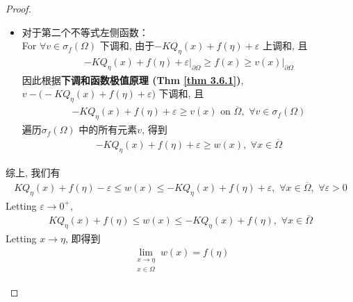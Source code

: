\begin{thm}
\begin{proof}
\begin{enumerate}
\begin{itemize}
					\item 对于第二个不等式左侧函数：\\
					For $\forall v \in \sigma_{f}(\Omega)$ 下调和, 由于$-K Q_{\eta}(x) + f(\eta) + \varepsilon$ 上调和, 且
					\begin{align*}
						-K Q_{\eta}(x) + f(\eta) + \varepsilon \Big|_{\partial \Omega} \geq f(x) \geq v(x) \Big|_{\partial \Omega}
					\end{align*}
					因此根据\textbf{下调和函数极值原理 (Thm \ref{thm 3.6.1})}, $v - \Big( -K Q_{\eta}(x) + f(\eta) + \varepsilon \Big)$ 下调和, 且
					\begin{align*}
						-K Q_{\eta}(x) + f(\eta) + \varepsilon \geq v(x) \,\, \text{on} \,\, \overline{\Omega} , \,\, \forall v \in \sigma_{f}(\Omega)
					\end{align*}
					遍历$\sigma_{f}(\Omega)$ 中的所有元素$v$, 得到
					\begin{align*}
						-K Q_{\eta}(x) + f(\eta) + \varepsilon \geq w(x) , \,\, \forall x \in \overline{\Omega}
					\end{align*}
				\end{itemize}
				
				\newpage
				
				综上, 我们有
				\begin{align*}
					K Q_\eta(x) + f(\eta) - \varepsilon \leq w(x) \leq -K Q_{\eta}(x) + f(\eta) + \varepsilon , \,\, \forall x \in \overline{\Omega} , \,\, \forall \varepsilon > 0
				\end{align*}
				Letting $\varepsilon \to 0^+$, 
				\begin{align*}
					K Q_\eta(x) + f(\eta) \leq w(x) \leq -K Q_{\eta}(x) + f(\eta) , \,\, \forall x \in \overline{\Omega}
				\end{align*}
				Letting $x \to \eta$, 即得到
				\begin{align*}
					\lim_{\substack{x \to \eta \\ x \in \Omega}} w(x) = f(\eta)
				\end{align*}
			\end{enumerate}
		\end{proof}
	\end{thm}















	\ifx\allfiles\undefined

\fi